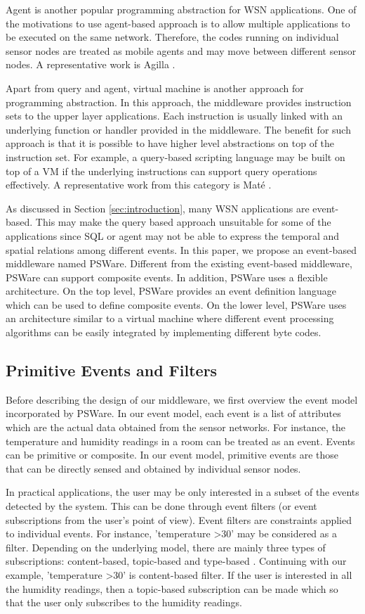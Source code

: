 Agent is another popular programming abstraction for WSN applications. One of the motivations to use agent-based approach is to allow multiple applications to be executed on the same network. Therefore, the codes running on individual sensor nodes are treated as mobile agents and may move between different sensor nodes. A representative work is Agilla \cite{agilla}.

Apart from query and agent, virtual machine is another approach for programming abstraction. In this approach, the middleware provides instruction sets to the upper layer applications. Each instruction is usually linked with an underlying function or handler provided in the middleware. The benefit for such approach is that it is possible to have higher level abstractions on top of the instruction set. For example, a query-based scripting language may be built on top of a VM if the underlying instructions can support query operations effectively. A representative work from this category is Mat\'{e} \cite{mate}.

As discussed in Section \ref{sec:introduction}, many WSN applications are event-based. This may make the query based approach unsuitable for some of the applications since SQL or agent may not be able to express the temporal and spatial relations among different events. In this paper, we propose an event-based middleware named PSWare. Different from the existing event-based middleware, PSWare can support composite events. In addition, PSWare uses a flexible architecture. On the top level, PSWare provides an event definition language which can be used to define composite events. On the lower level, PSWare uses an architecture similar to a virtual machine where different event processing algorithms can be easily integrated by implementing different byte codes.

\subsection{Primitive Events and Filters}
Before describing the design of our middleware, we first overview the event model incorporated by PSWare. In our event model, each event is a list of attributes which are the actual data obtained from the sensor networks. For instance, the temperature and humidity readings in a room can be treated as an event. Events can be primitive or composite. In our event model, primitive events are those that can be directly sensed and obtained by individual sensor nodes.

In practical applications, the user may be only interested in a subset of the events detected by the system. This can be done through event filters (or event subscriptions from the user's point of view). Event filters are constraints applied to individual events. For instance, 'temperature \textgreater 30' may be considered as a filter. Depending on the underlying model, there are mainly three types of subscriptions: content-based, topic-based and type-based \cite{facespubsub}. Continuing with our example, 'temperature \textgreater 30' is content-based filter. If the user is interested in all the humidity readings, then a topic-based subscription can be made which so that the user only subscribes to the humidity readings. 

